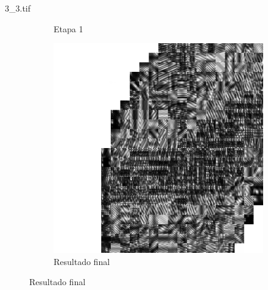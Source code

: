 \documentclass{beamer}
\begin{document}
\begin{frame}{3\_3.tif}
\begin{figure}
\begin{subfigure}[!ht]{0.32\textwidth}
                \caption{Etapa 1}
            \end{subfigure}
            \begin{subfigure}[!ht]{0.32\textwidth}
                \includegraphics[width=\columnwidth]{Fingerprints/3_3_final.jpg}
                \caption{Resultado final}
            \end{subfigure}
        \end{figure}
    \end{frame}
\end{document}

